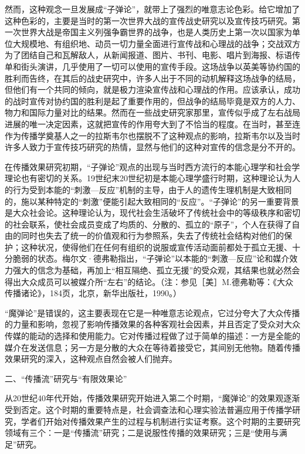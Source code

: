 \documentclass[UTF8,12pt]{ctexart}
\numberwithin{equation}{section} %
\numberwithin{figure}{section}
\numberwithin{table}{section}
\begin{document}
	然而，这种观念一旦发展成“子弹论”，就带上了强烈的唯意志论色彩。给它增加了这种色彩的，主要是当时的第一次世界大战的宣传战史研究以及宣传技巧研究。第一次世界大战是帝国主义列强争霸世界的战争，也是人类历史上第一次以国家为单位大规模地、有组织地、动员一切力量全面进行宣传战和心理战的战争；交战双方为了团结自己和瓦解敌人，从新闻报道、图片、书刊、电影、唱片到海报、标语传单和街头演讲，几乎使用了一切可以使用的宣传手段。这场战争以英美等协约国的胜利而告终，在其后的战史研究中，许多人出于不同的动机解释这场战争的结局，但他们有一个共同的倾向，就是极力渲染宣传战和心理战的作用。应该承认，成功的战时宣传对协约国的胜利是起了重要作用的，但战争的结局毕竟是双方的人力、物力和国际力量对比的结果。然而在一些战史研究家那里，宣传似乎成了左右战局进展的唯一决定因素，这就把宣传的作用夸大到了不恰当的程度。在当时，甚至连作为传播学奠基人之一的拉斯韦尔也摆脱不了这种观点的影响，拉斯韦尔以及当时许多人致力于宣传技巧研究的热情，显然与他们的这种对宣传的信念是分不开的。
	
	在传播效果研究初期，“子弹论”观点的出现与当时西方流行的本能心理学和社会学理论也有密切的关系。19世纪末20世纪初是本能心理学盛行时期，这种理论认为人的行为受到本能的“刺激—反应”机制的主导，由于人的遗传生理机制是大致相同的，施以某种特定的“刺激”便能引起大致相同的“反应”。“子弹论”的另一重要背景是大众社会论。这种理论认为，现代社会生活破坏了传统社会中的等级秩序和密切的社会联系，使社会成员变成了均质的、分散的、孤立的“原子”，个人在获得了自由的同时也失去了统一的价值观和行为参照系，失去了传统社会结构对他们的保护；这种状况，使得他们在任何有组织的说服或宣传活动面前都处于孤立无援、十分脆弱的状态。梅尔文·德弗勒指出，“子弹论”以本能的“刺激—反应”论和媒介效力强大的信念为基础，再加上“相互隔绝、孤立无援”的受众观，其结果也就必然会得出大众成员可以被媒介所“左右”的结论。（注：参见［美］M.德弗勒等：《大众传播诸论》，184页，北京，新华出版社，1990。）
	
	“魔弹论”是错误的，这主要表现在它是一种唯意志论观点，它过分夸大了大众传播的力量和影响，忽视了影响传播效果的各种客观社会因素，并且否定了受众对大众传媒的能动的选择和使用能力。它对传播过程做了过于简单的描述：一方是全能的媒介在发送信息；另一方是分散的大众在等待着接受它，其间别无他物。随着传播效果研究的深入，这种观点自然会被人们抛弃。
	
	二、“传播流”研究与“有限效果论”
	
	从20世纪40年代开始，传播效果研究开始进入第二个时期，“魔弹论”的效果观逐渐受到否定。这个时期的重要特点是，社会调查法和心理实验法普遍应用于传播学研究，学者们开始对传播效果产生的过程与机制进行实证考察。这个时期的主要研究领域有三个：一是“传播流”研究；二是说服性传播的效果研究；三是“使用与满足”研究。
	
\end{document}
